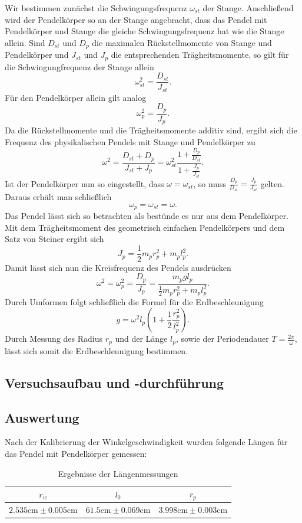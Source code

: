 Wir bestimmen zunächst die Schwingungsfrequenz $\omega_{st}$ der Stange. Anschließend wird der Pendelkörper so an der Stange angebracht, dass das Pendel mit Pendelkörper und Stange die gleiche Schwingungsfrequenz hat wie die Stange allein. Sind $D_{st}$ und $D_p$ die maximalen Rückstellmomente von Stange und Pendelkörper und $J_{st}$ und $J_p$ die entsprechenden Trägheitsmomente, so gilt für die Schwingungfrequenz der Stange allein
$$\omega_{st}^2 = \frac{D_{st}}{J_{st}}\text{.}$$
Für den Pendelkörper allein gilt analog
$$\omega_p^2 = \frac{D_p}{J_p}\text{.}$$
Da die Rückstellmomente und die Trägheitsmomente additiv sind, ergibt sich die Frequenz des physikalischen Pendels mit Stange und Pendelkörper zu
$$\omega^2 = \frac{D_{st} + D_p}{J_{st} + J_p} = \omega_{st}^2 \frac{1+\frac{D_p}{D_{st}}}{1+\frac{J_p}{J_{st}}}\text{.}$$
Ist der Pendelkörper nun so eingestellt, dass $\omega = \omega_{st}$, so muss $\frac{D_p}{D_{st}} = \frac{J_p}{J_{st}}$ gelten. Daraus erhält man schließlich
$$\omega_p = \omega_{st} = \omega\text{.}$$
Das Pendel lässt sich so betrachten als bestünde es nur aus dem Pendelkörper. Mit dem Trägheitsmoment des geometrisch einfachen Pendelkörpers und dem Satz von Steiner ergibt sich
$$J_p = \frac 12 m_p r_p^2 + m_pl_p^2\text{.}$$
Damit lässt sich nun die Kreisfrequenz des Pendels ausdrücken
$$\omega^2 = \omega_p^2 = \frac{D_p}{J_p} = \frac{m_pgl_p}{\frac 12 m_pr_p^2+m_pl_p^2}\text{.}$$
Durch Umformen folgt schließlich die Formel für die Erdbeschleunigung
$$g = \omega^2l_p \left( 1 + \frac 12 \frac{r_p^2}{l_p^2} \right)\text{.}$$
Durch Messung des Radius $r_p$ und der Länge $l_p$, sowie der Periodendauer $T = \frac{2\pi}{\omega}$, lässt sich somit die Erdbeschleunigung bestimmen.

\subsection{Versuchsaufbau und -durchführung}


\subsection{Auswertung}
Nach der Kalibrierung der Winkelgeschwindigkeit wurden folgende Längen für das Pendel mit Pendelkörper gemessen:

\begin{table}[H]
\centering
\begin{tabular}{c|c|c}
$r_w$ & $l_0$ & $r_p$ \\
\hline
$2.535\text{cm} \pm 0.005\text{cm}$ & $61.5\text{cm}\pm 0.069\text{cm}$ & $3.998\text{cm} \pm 0.003\text{cm}$
\end{tabular}
\caption{Ergebnisse der Längenmessungen}
\end{table}

